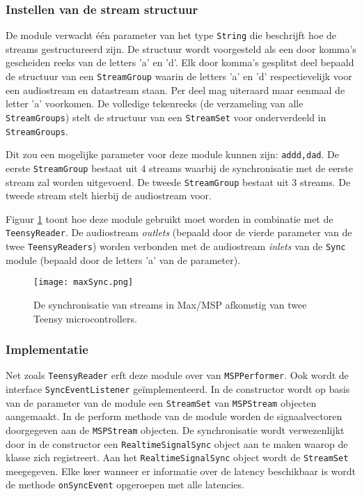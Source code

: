 \subsubsection{Instellen van de stream structuur}

De module verwacht één parameter van het type \texttt{String} die beschrijft hoe de streams gestructureerd zijn. De structuur wordt voorgesteld als een door komma's gescheiden reeks van de letters 'a' en 'd'. Elk door komma's gesplitst deel bepaald de structuur van een \texttt{StreamGroup} waarin de letters 'a' en 'd' respectievelijk voor een audiostream en datastream staan. Per deel mag uiteraard maar eenmaal de letter 'a' voorkomen. De volledige tekenreeks  (de verzameling van alle \texttt{StreamGroups}) stelt de structuur van een \texttt{StreamSet} voor onderverdeeld in \texttt{StreamGroups}.

Dit zou een mogelijke parameter voor deze module kunnen zijn: \texttt{addd,dad}. De eerste \texttt{StreamGroup} bestaat uit 4 streams waarbij de synchronisatie met de eerste stream zal worden uitgevoerd. De tweede \texttt{StreamGroup} bestaat uit 3 streams. De tweede stream stelt hierbij de audiostream voor.

Figuur \ref{maxStreamSync} toont hoe deze module gebruikt moet worden in combinatie met de \texttt{TeensyReader}. De audiostream \textit{outlets} (bepaald door de vierde parameter van de twee \texttt{TeensyReaders}) worden verbonden met de audiostream \textit{inlets} van de \texttt{Sync} module (bepaald door de letters 'a' van de parameter).

\begin{figure}[h!]
	\captionsetup{width=0.8\textwidth}
	\caption[Synchronisatie in Max/MSP]{De synchronisatie van streams in Max/MSP afkomstig van twee Teensy microcontrollers.}
	\begin{center}
		\advance\parskip0.3cm
		\texttt{[image: maxSync.png]}
	\end{center}
	\label{maxStreamSync}
\end{figure}

\subsubsection{Implementatie}

Net zoals \texttt{TeensyReader} erft deze module over van \texttt{MSPPerformer}. Ook wordt de interface \texttt{SyncEventListener} geïmplementeerd. In de constructor wordt op basis van de parameter van de module een \texttt{StreamSet} van \texttt{MSPStream} objecten aangemaakt. In de perform methode van de module worden de signaalvectoren doorgegeven aan de \texttt{MSPStream} objecten. De synchronisatie wordt verwezenlijkt door in de constructor een \texttt{RealtimeSignalSync} object aan te maken waarop de klasse zich registreert. Aan het \texttt{RealtimeSignalSync} object wordt de \texttt{StreamSet} meegegeven. Elke keer wanneer er informatie over de latency beschikbaar is wordt de methode \texttt{onSyncEvent} opgeroepen met alle latencies.

